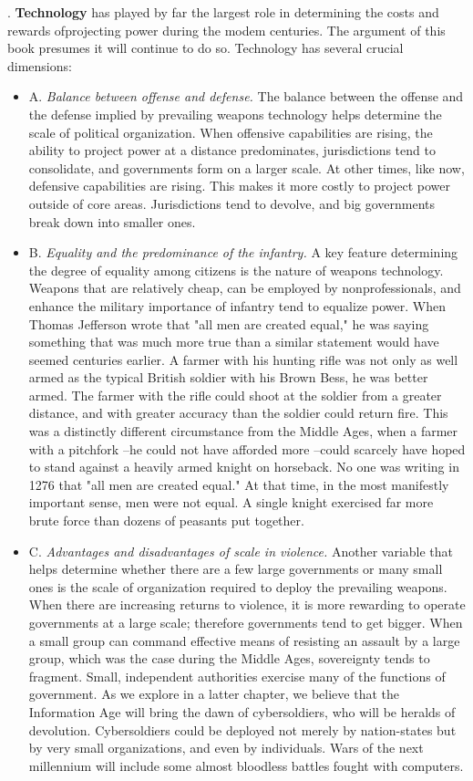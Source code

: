 \begin{paracol}{2}
. \textbf{Technology} has played by far the largest role in determining the costs and rewards ofprojecting power during the modem centuries. The argument of this book presumes it will continue to do so. Technology has several crucial dimensions:
\begin{itemize}
  \item A. \emph{Balance between offense and defense.} The balance between the offense and the defense implied by prevailing weapons technology helps determine the scale of political organization. When offensive capabilities are rising, the ability to project power at a distance predominates, jurisdictions tend to consolidate, and governments form on a larger scale. At other times, like now, defensive capabilities are rising. This makes it more costly to project power outside of core areas. Jurisdictions tend to devolve, and big governments break down into smaller ones.
  \item B. \emph{Equality and the predominance of the infantry.} A key feature determining the degree of equality among citizens is the nature of weapons technology. Weapons that are relatively cheap, can be employed by nonprofessionals, and enhance the military importance of infantry tend to equalize power. When Thomas Jefferson wrote that "all men are created equal," he was saying something that was much more true than a similar statement would have seemed centuries earlier. A farmer with his hunting rifle was not only as well armed as the typical British soldier with his Brown Bess, he was better armed. The farmer with the rifle could shoot at the soldier from a greater distance, and with greater accuracy than the soldier could return fire. This was a distinctly different circumstance from the Middle Ages, when a farmer with a pitchfork --he could not have afforded more --could scarcely have hoped to stand against a heavily armed knight on horseback. No one was writing in 1276 that "all men are created equal." At that time, in the most manifestly important sense, men were not equal. A single knight exercised far more brute force than dozens of peasants put together.
  \item C. \emph{Advantages and disadvantages of scale in violence.} Another variable that helps determine whether there are a few large governments or many small ones is the scale of organization required to deploy the prevailing weapons. When there are increasing returns to violence, it is more rewarding to operate governments at a large scale; therefore governments tend to get bigger. When a small group can command effective means of resisting an assault by a large group, which was the case during the Middle Ages, sovereignty tends to fragment. Small, independent authorities exercise many of the functions of government. As we explore in a latter chapter, we believe that the Information Age will bring the dawn of cybersoldiers, who will be heralds of devolution. Cybersoldiers could be deployed not merely by nation-states but by very small organizations, and even by individuals. Wars of the next millennium will include some almost bloodless battles fought with computers.

\end{itemize}
\end{paracol}
